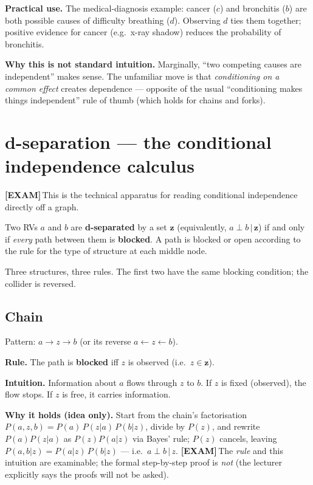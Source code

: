 \documentclass[11pt, a4paper]{article}
\newcommand{\examflag}{\textcolor{tipBd}{\textbf{[EXAM]}}\,}
\begin{document}
\textbf{Practical use.} The medical-diagnosis example: cancer ($c$) and bronchitis ($b$) are both possible causes of difficulty breathing ($d$). Observing $d$ ties them together; positive evidence for cancer (e.g.\ x-ray shadow) reduces the probability of bronchitis.

\textbf{Why this is not standard intuition.} Marginally, ``two competing causes are independent'' makes sense. The unfamiliar move is that \emph{conditioning on a common effect} creates dependence — opposite of the usual ``conditioning makes things independent'' rule of thumb (which holds for chains and forks).

\section{d-separation --- the conditional independence calculus}

\examflag{}This is the technical apparatus for reading conditional independence directly off a graph.

\begin{defbox}[d-separation]
Two RVs $a$ and $b$ are \textbf{d-separated} by a set $\mathbf{z}$ (equivalently, $a \perp b \,|\, \mathbf{z}$) if and only if \emph{every} path between them is \textbf{blocked}. A path is blocked or open according to the rule for the type of structure at each middle node.
\end{defbox}

Three structures, three rules. The first two have the same blocking condition; the collider is reversed.

\subsection{Chain}

Pattern: $a \to z \to b$ (or its reverse $a \leftarrow z \leftarrow b$).

\textbf{Rule.} The path is \textbf{blocked} iff $z$ is observed (i.e.\ $z \in \mathbf{z}$).

\textbf{Intuition.} Information about $a$ flows through $z$ to $b$. If $z$ is fixed (observed), the flow stops. If $z$ is free, it carries information.

\textbf{Why it holds (idea only).} Start from the chain's factorisation $P(a,z,b) = P(a)\,P(z|a)\,P(b|z)$, divide by $P(z)$, and rewrite $P(a)P(z|a)$ as $P(z)P(a|z)$ via Bayes' rule; $P(z)$ cancels, leaving $P(a,b|z) = P(a|z)\,P(b|z)$ — i.e.\ $a \perp b\,|\,z$. \examflag{}The \emph{rule} and this intuition are examinable; the formal step-by-step proof is \emph{not} (the lecturer explicitly says the proofs will not be asked).
\end{document}
